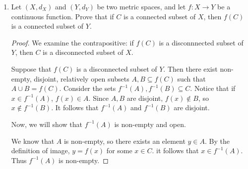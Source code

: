\documentclass{article}
\theoremstyle{plain} %
\numberwithin{thm}{section} %
\theoremstyle{definition}
\begin{document}
\begin{enumerate}[label=(\alph*)]
\begin{proof}
                In both cases, we have shown that \(I\) is not an interval.
    
                Conversely, suppose that \(I\) is not an interval. Then for \(p<q \in I\), there is a \(c \in [p,q]\) such that \(c \notin I\). Define subsets \(A\) and \(B\) in \(I\) as \(A = \{x\in I \colon x < c\}\) and \(B = \{x\in I \colon x > c\}\). \(A\) and \(B\) are non-empty because \(p \in A\) and \(q \in B\). The sets are also disjoint by construction.
                
                To show that \(A\) is open, first take any \(a \in A\). For this value of \(a\), take \(\varepsilon = c - a > 0\). For all \(x \in B_I(a, \varepsilon)\), note that \(x \in I\). As well, if \(x < a\), immediately we have \(x < a < c \implies x \in A\). If \(x >a\), since \(x\) is within the open ball surrounding \(a\), \(x-a = |x-a| < c-a \implies x<c \implies x\in A\). Thus every element of \(A\) is an interior point, so \(A\) is open.
    
                We can use a very similar argument for the set \(B\), so the proof is omitted. We conclude that \(B\) is open as well. Therefore \(I\) is disconnected.
    
            \end{proof}
    
            \item Let $(X,d_X)$ and $(Y,d_Y)$ be two metric spaces, and let $f:X\rightarrow Y$ be a continuous function. Prove that if $C$ is a connected subset of $X$, then $f(C)$ is a connected subset of $Y$.
            
            \begin{proof}
                We examine the contrapositive: if \(f(C)\) is a disconnnected subset of \(Y\), then \(C\) is a disconnected subset of \(X\).
    
                Suppose that \(f(C)\) is a disconnected subset of \(Y\). Then there exist non-empty, disjoint, relatively open subsets \(A,B \subseteq f(C)\) such that \(A \cup B = f(C)\). Consider the sets \(f^{-1} (A), f^{-1} (B) \subseteq C\). Notice that if \(x \in f^{-1} (A)\), \(f(x) \in A\). Since \(A,B\) are disjoint, \(f(x) \notin B\), so \(x \notin f^{-1} (B)\). It follows that \(f^{-1} (A)\) and \(f^{-1} (B)\) are disjoint.
                
                Now, we will show that \(f^{-1} (A)\) is non-empty and open.
                
                We know that \(A\) is non-empty, so there exists an element \(y \in A\). By the definition of image, \(y=f(x)\) for some \(x \in C\). it follows that \(x \in f^{-1} (A)\). Thus \(f^{-1} (A)\) is non-empty.
                

\end{proof}
\end{enumerate}
\end{document}
